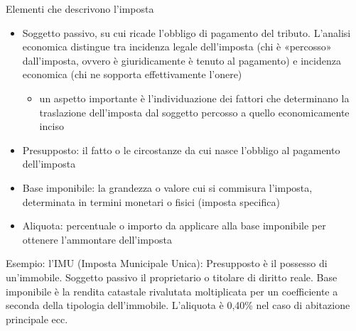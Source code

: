 \documentclass[11pt]{beamer}
\begin{document}
\begin{frame}{Elementi che descrivono l'imposta}
\begin{itemize}
\item \alert{Soggetto passivo}, su cui ricade l'obbligo di pagamento del
tributo. L'analisi economica distingue tra \alert{incidenza legale} dell'imposta
(chi è «percosso» dall'imposta, ovvero è giuridicamente è tenuto al pagamento) e \alert{incidenza economica} (chi ne sopporta effettivamente l'onere)
\begin{itemize}
\item un aspetto importante è l'individuazione dei fattori che determinano la
\alert{traslazione} dell'imposta dal soggetto percosso a quello
economicamente inciso
\end{itemize}
\item \alert{Presupposto}: il fatto o le circostanze da cui nasce l'obbligo al pagamento
dell'imposta
\item \alert{Base imponibile}: la grandezza o valore cui si commisura l'imposta, determinata in termini monetari o fisici (imposta \alert{specifica})
\item \alert{Aliquota}: percentuale o importo da applicare alla base imponibile per
ottenere l'ammontare dell'imposta
\end{itemize}

\footnotesize
\begin{block}{}
\alert{Esempio: l'IMU (Imposta Municipale Unica):} Presupposto è il possesso di un'immobile. Soggetto passivo il proprietario o
titolare di diritto reale. Base imponibile è la rendita catastale rivalutata
moltiplicata per un coefficiente a seconda della tipologia
dell'immobile. L'aliquota è 0,40\% nel caso di abitazione principale ecc.
\end{block}
\end{frame}
\end{document}
